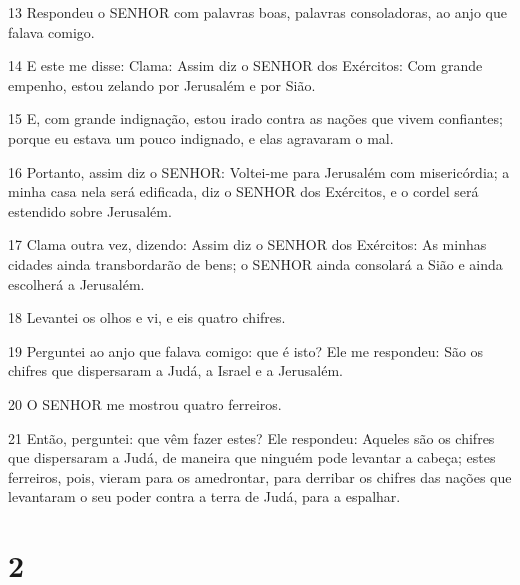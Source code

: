 \par 13 Respondeu o SENHOR com palavras boas, palavras consoladoras, ao anjo que falava comigo.
\par 14 E este me disse: Clama: Assim diz o SENHOR dos Exércitos: Com grande empenho, estou zelando por Jerusalém e por Sião.
\par 15 E, com grande indignação, estou irado contra as nações que vivem confiantes; porque eu estava um pouco indignado, e elas agravaram o mal.
\par 16 Portanto, assim diz o SENHOR: Voltei-me para Jerusalém com misericórdia; a minha casa nela será edificada, diz o SENHOR dos Exércitos, e o cordel será estendido sobre Jerusalém.
\par 17 Clama outra vez, dizendo: Assim diz o SENHOR dos Exércitos: As minhas cidades ainda transbordarão de bens; o SENHOR ainda consolará a Sião e ainda escolherá a Jerusalém.
\par 18 Levantei os olhos e vi, e eis quatro chifres.
\par 19 Perguntei ao anjo que falava comigo: que é isto? Ele me respondeu: São os chifres que dispersaram a Judá, a Israel e a Jerusalém.
\par 20 O SENHOR me mostrou quatro ferreiros.
\par 21 Então, perguntei: que vêm fazer estes? Ele respondeu: Aqueles são os chifres que dispersaram a Judá, de maneira que ninguém pode levantar a cabeça; estes ferreiros, pois, vieram para os amedrontar, para derribar os chifres das nações que levantaram o seu poder contra a terra de Judá, para a espalhar.

\chapter{2}

